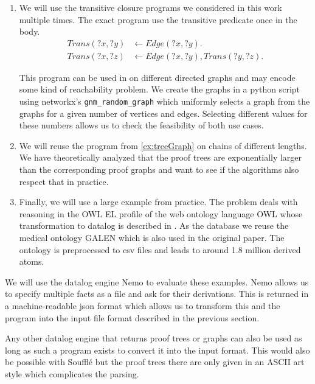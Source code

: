 \begin{enumerate}
    \item We will use the transitive closure programs we considered in this work multiple times. The exact program use the transitive predicate once in the body.
    \begin{equation}
        \begin{split}
            Trans(?x, ?y) &\leftarrow Edge(?x, ?y). \\
            Trans(?x, ?z) &\leftarrow Edge(?x, ?y),  Trans(?y, ?z). 
        \end{split}
    \end{equation}

    This program can be used in on different directed graphs and may encode some kind of reachability problem. We create the graphs in a python script using networkx's \lstinline|gnm_random_graph| which uniformly selects a graph from the graphs for a given number of vertices and edges. Selecting different values for these numbers allows us to check the feasibility of both use cases.

    \item We will reuse the program from \cref{ex:treeGraph} on chains of different lengths. We have theoretically analyzed that the proof trees are exponentially larger than the corresponding proof graphs and want to see if the algorithms also respect that in practice.
    
    \item Finally, we will use a large example from practice. The problem deals with reasoning in the OWL EL profile of the web ontology language OWL whose transformation to datalog is described in \cite{ELK}. As the database we reuse the medical ontology GALEN which is also used in the original paper. The ontology is preprocessed to csv files and leads to around 1.8 million derived atoms.
\end{enumerate}

We will use the datalog engine Nemo\cite{Nemo} to evaluate these examples. Nemo allows us to specify multiple facts as a file and ask for their derivations. This is returned in a machine-readable json format which allows us to transform this and the program into the input file format described in the previous section.

Any other datalog engine that returns proof trees or graphs can also be used as long as such a program exists to convert it into the input format. This would also be possible with Soufflé\cite{Souffle} but the proof trees there are only given in an ASCII art style which complicates the parsing.


